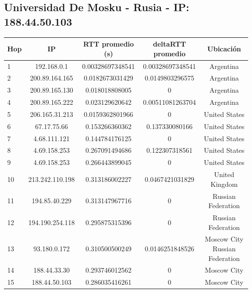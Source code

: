  
\subsection{Universidad De Mosku - Rusia - IP: 188.44.50.103}

\bigskip

\begin{tabular}{| l | c | c | c | c |}
 \hline 
Hop & IP &  RTT promedio (s)  & deltaRTT promedio & Ubicación\\
\hline 
1  &  192.168.0.1  &  0.00328697348541    &  0.00328697348541 & Argentina\\
\hline 
2  &  200.89.164.165  &  0.0182673031429    &  0.0149803296575 & Argentina\\
\hline 
3  &  200.89.165.130  &  0.018018808005    &  0 & Argentina\\
\hline 
4  &  200.89.165.222  &  0.023129620642   &  0.00511081263704 & Argentina\\
\hline 
5  &  206.165.31.213  &  0.0159362801966    &  0 & United States\\
\hline 
6  &  67.17.75.66  &  0.153266360362    &  0.137330080166 &  United States\\
\hline 
7  &  4.68.111.121  &  0.144784176125    &  0 & United States\\
\hline 
8  &  4.69.158.253  &  0.267091494686    &  0.122307318561 &  United States\\
\hline 
9  &  4.69.158.253  &  0.266443899045    &  0 & United States\\
\hline 
10  &  213.242.110.198  &  0.313186002227    &  0.0467421031829 & United Kingdom\\
\hline 
11  &  194.85.40.229  &  0.313147967716    &  0 & Russian Federation\\
\hline 
12  &  194.190.254.118  &  0.295875315396    &  0 & Russian Federation\\
\hline 
13  &  93.180.0.172  &  0.310500500249   &  0.0146251848526 & Moscow City Russian Federation\\
\hline 
14  &  188.44.33.30  &  0.293746012562    &  0 & Moscow City\\
\hline 
15  &  188.44.50.103  &  0.286035416261   &  0 & Moscow City\\
\hline 
\end{tabular}

\bigskip

